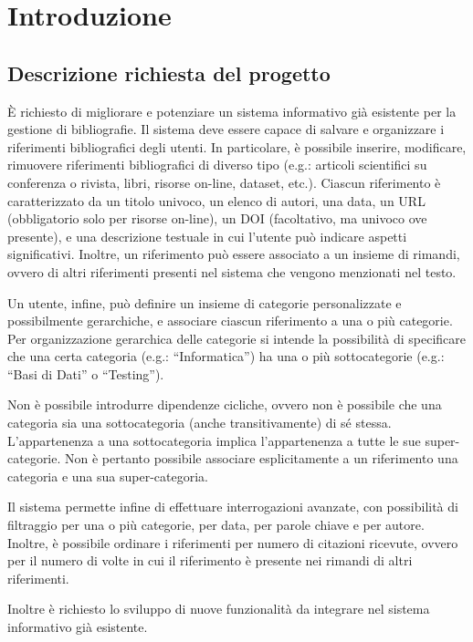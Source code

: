 \chapter{Introduzione}
\raggedright{\section{Descrizione richiesta del progetto}}

È richiesto di migliorare e potenziare un sistema informativo già esistente per la gestione di bibliografie. Il sistema deve essere capace di salvare e organizzare i riferimenti bibliografici degli utenti.  In particolare, è possibile inserire, modificare, rimuovere riferimenti bibliografici di diverso tipo (e.g.: articoli scientifici su conferenza o rivista, libri, risorse on-line, dataset, etc.).
Ciascun riferimento è caratterizzato da un titolo univoco, un elenco di autori, una data, un URL (obbligatorio solo per risorse on-line), un DOI (facoltativo, ma univoco ove presente), e una descrizione testuale in cui l’utente può indicare aspetti significativi.
Inoltre, un riferimento può essere associato a un insieme di rimandi, ovvero di altri riferimenti presenti nel sistema che vengono menzionati nel testo.

Un utente, infine, può definire un insieme di categorie personalizzate e possibilmente gerarchiche, e associare ciascun riferimento a una o più categorie. Per organizzazione gerarchica delle categorie si intende la possibilità di specificare che una certa categoria (e.g.: “Informatica”) ha una o più sottocategorie (e.g.: “Basi di Dati” o “Testing”).

Non è possibile introdurre dipendenze cicliche, ovvero non è possibile che una categoria sia una sottocategoria (anche transitivamente) di sé stessa. L’appartenenza a una sottocategoria implica l’appartenenza a tutte le sue super-categorie. Non è pertanto possibile associare esplicitamente a un riferimento una categoria e una sua super-categoria.

Il sistema permette infine di effettuare interrogazioni avanzate, con possibilità di filtraggio per una o più categorie, per data, per parole chiave e per autore. Inoltre, è possibile ordinare i riferimenti per numero di citazioni ricevute, ovvero per il numero di volte in cui il riferimento è presente nei rimandi di altri riferimenti.

Inoltre è richiesto lo sviluppo di nuove funzionalità da integrare nel sistema informativo già esistente.

